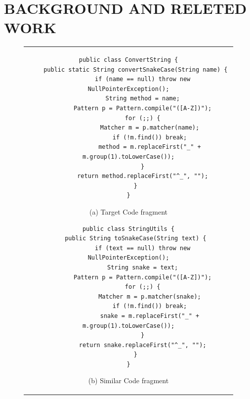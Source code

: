 \documentclass[conference]{IEEEtran}
\begin{document}

\section{BACKGROUND AND RELETED WORK}

\begin{figure}[t]
\begin{center}
  \begin{tabular}{c}

    \begin{minipage}{0.5\hsize}
      \begin{center}
\begin{lstlisting}
public class ConvertString {
    public static String convertSnakeCase(String name) {
        if (name == null) throw new NullPointerException();
        String method = name;
        Pattern p = Pattern.compile("([A-Z])");
        for (;;) {
            Matcher m = p.matcher(name);
            if (!m.find()) break;
            method = m.replaceFirst("_" + m.group(1).toLowerCase());
        }
        return method.replaceFirst("^_", "");
    }
}
\end{lstlisting}
{\scriptsize (a) Target Code fragment}
\end{center}
\end{minipage}

    \begin{minipage}{0.5\hsize}
      \begin{center}
\begin{lstlisting}
public class StringUtils {
    public String toSnakeCase(String text) {
        if (text == null) throw new NullPointerException();
        String snake = text;
        Pattern p = Pattern.compile("([A-Z])");
        for (;;) {
            Matcher m = p.matcher(snake);
            if (!m.find()) break;
            snake = m.replaceFirst("_" + m.group(1).toLowerCase());
        }
        return snake.replaceFirst("^_", "");
    }
}
\end{lstlisting}
{\scriptsize (b) Similar Code fragment}
      \end{center}
    \end{minipage}
  \end{tabular}
  \end{center}
\end{figure}
\end{document}
